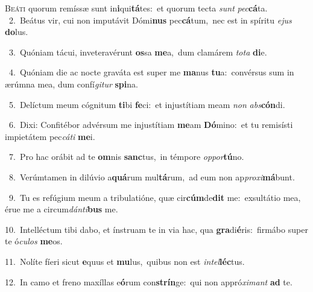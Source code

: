 \lettrine{\initial\textcolor{\initialcolor}{B}}{eáti} quorum remíssæ sunt in\-\textbf{i}\-qui\-\textbf{tá}\-tes:~\star et quorum tecta \textit{sunt} \textit{pec}\-\textbf{cá}ta.\\
{\numbfont\textcolor{\numbcolor}{~2.}}~Beátus vir, cui non imputávit Dómi\textbf{nus} pec\-\textbf{cá}\-tum,~\star nec est in spíritu \textit{e}\-\textit{jus} \textbf{do}\-lus.\par
{\numbfont\textcolor{\numbcolor}{~3.}}~Quóniam tácui, inveteravérunt \textbf{os}\-sa \textbf{me}\-a,~\star dum clamárem \textit{to}\-\textit{ta} \textbf{di}\-e.\par
{\numbfont\textcolor{\numbcolor}{~4.}}~Quóniam die ac nocte graváta est super me \textbf{ma}\-nus \textbf{tu}\-a:~\star convérsus sum in ærúmna mea, dum confí\-\textit{gi}\-\textit{tur} \textbf{spi}\-na.\par
{\numbfont\textcolor{\numbcolor}{~5.}}~Delíctum meum cógnitum \textbf{ti}\-bi \textbf{fe}\-ci:~\star et injustítiam meam \textit{non} \textit{abs}\-\textbf{cón}di.\par
{\numbfont\textcolor{\numbcolor}{~6.}}~Dixi: Confitébor advérsum me injustítiam \textbf{me}\-am \textbf{Dó}\-mino:~\star et tu remisísti impietátem pec\-\textit{cá}\-\textit{ti} \textbf{me}\-i.\par
{\numbfont\textcolor{\numbcolor}{~7.}}~Pro hac orábit ad te \textbf{om}\-nis \textbf{sanc}\-tus,~\star in témpore \textit{op}\-\textit{por}\textbf{tú}no.\par
{\numbfont\textcolor{\numbcolor}{~8.}}~Verúmtamen in dilúvio a\-\textbf{quá}\-rum mul\-\textbf{tá}\-rum,~\star ad eum non ap\-\textit{pro}\-\textit{xi}\textbf{má}bunt.\par
{\numbfont\textcolor{\numbcolor}{~9.}}~Tu es refúgium meum a tribulatióne, quæ cir\-\textbf{cúm}\-de\textbf{dit} me:~\star exsultátio mea, érue me a circum\-\textit{dán}\-\textit{ti}\textbf{bus} me.\par
{\numbfont\textcolor{\numbcolor}{10.}}~Intelléctum tibi dabo, et ínstruam te in via hac, qua \textbf{gra}\-di\-\textbf{é}\-ris:~\star firmábo super te ó\-\textit{cu}\-\textit{los} \textbf{me}\-os.\par
{\numbfont\textcolor{\numbcolor}{11.}}~Nolíte fíeri sicut \textbf{e}\-quus et \textbf{mu}\-lus,~\star quibus non est \textit{in}\-\textit{tel}\textbf{léc}tus.\par
{\numbfont\textcolor{\numbcolor}{12.}}~In camo et freno maxíllas e\-\textbf{ó}\-rum con\-\textbf{strín}\-ge:~\star qui non appró\-\textit{xi}\-\textit{mant} \textbf{ad} te.\par
